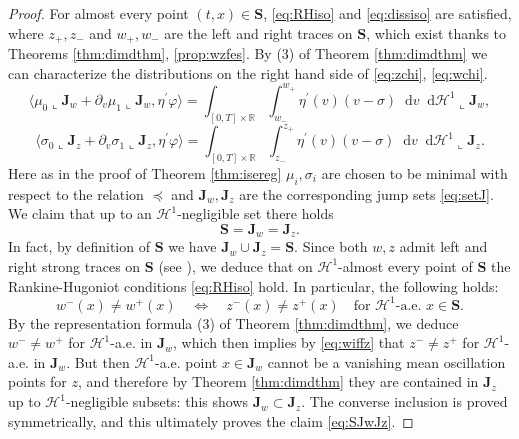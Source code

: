 \documentclass[11pt, twoside, reqno]{amsart}
\theoremstyle{definition}
\theoremstyle{remark}
\numberwithin{equation}{section}
\newcommand*\dif{\mathop{}\!\mathrm{d}}
\begin{document}
\begin{proof}
    For almost every point $(t,x) \in \mathbf S$, \eqref{eq:RHiso} and \eqref{eq:dissiso} are satisfied, where $z_+, z_-$ and $w_+, w_-$ are the left and right traces on $\mathbf S$, which exist thanks to Theorems \ref{thm:dimdthm}, \ref{prop:wzfes}.
By (3) of Theorem \ref{thm:dimdthm} we can characterize the distributions on the right hand side of \eqref{eq:zchi}, \eqref{eq:wchi}. 
\begin{equation}
    \langle \mu_0 \llcorner \mathbf J_w + \partial_v \mu_1 \llcorner \mathbf J_w, \eta^\prime \varphi\rangle  =  \int_{[0,T] \times \mathbb R} \int_{w_-}^{w_+} \eta^\prime(v)(v- \sigma) \dif v \dif \mathscr H^1 \llcorner \mathbf J_w,
\end{equation}
\begin{equation}
    \langle \sigma_0 \llcorner \mathbf J_z + \partial_v \sigma_1 \llcorner \mathbf J_z, \eta^\prime \varphi\rangle  =  \int_{[0,T] \times \mathbb R} \int_{z_-}^{z_+} \eta^\prime(v)(v- \sigma) \dif v \dif \mathscr H^1 \llcorner \mathbf J_z.
\end{equation}
Here as in the proof of Theorem \ref{thm:isereg} $\mu_i, \sigma_i$ are chosen to be minimal with respect to the relation $\preceq$ and $\mathbf J_w, \mathbf J_z$ are the corresponding jump sets \eqref{eq:setJ}.
We claim that up to an $\mathscr H^1$-negligible set there holds
\begin{equation}\label{eq:SJwJz}
\mathbf S = \mathbf J_w = \mathbf J_z.
\end{equation}
In fact, by definition of $\mathbf S$ we have $\mathbf J_w \cup \mathbf J_z = \mathbf S$. Since both $w, z$ admit left and right strong traces on $\mathbf S$ (see \cite{Va01}), we deduce that on $\mathscr H^1$-almost every point of $\mathbf S$ the Rankine-Hugoniot conditions \eqref{eq:RHiso} hold. In particular, the following holds:
\begin{equation}\label{eq:wiffz}
w^-(x) \neq w^+(x) \quad \Leftrightarrow \quad z^-(x) \neq z^+(x) \quad \text{for $\mathscr H^1$-a.e. $x \in \mathbf S$}.
\end{equation}
By the representation formula (3) of Theorem \ref{thm:dimdthm}, we deduce $w^- \neq w^+$ for $\mathscr H^1$-a.e. in $\mathbf J_w$, which then implies by \eqref{eq:wiffz} that $z^- \neq z^+$ for $\mathscr H^1$-a.e. in $\mathbf J_w$. But then $\mathscr H^1$-a.e. point $x \in \mathbf J_w$ cannot be a vanishing mean oscillation points for $z$, and therefore by Theorem \ref{thm:dimdthm} they are contained in $\mathbf J_z$ up to $\mathscr H^1$-negligible subsets: this shows $\mathbf J_w \subset \mathbf J_z$. The converse inclusion is proved symmetrically, and this ultimately proves the claim \eqref{eq:SJwJz}.


\end{proof}
\end{document}
